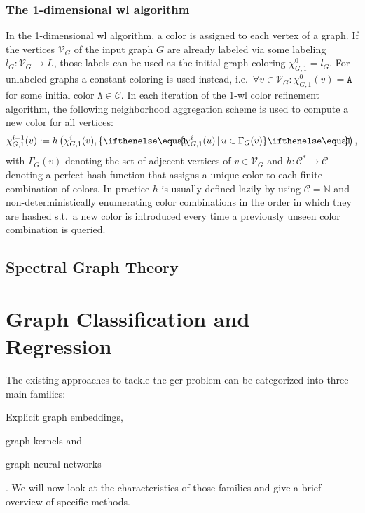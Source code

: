 \subsubsection{The 1-dimensional \acs{wl} algorithm}
In the 1-dimensional \ac{wl} algorithm, a color is assigned to each vertex of a graph.
If the vertices $\mathcal{V}_G$ of the input graph $G$ are already labeled via some labeling $l_G: \mathcal{V}_G \to L$, those labels can be used as the initial graph coloring $\chi_{G,1}^0 = l_G$.
For unlabeled graphs a constant coloring is used instead, i.e.\ $\forall v \in \mathcal{V}_G: \chi_{G,1}^0(v) = \texttt{A}$ for some initial color $\texttt{A} \in \mathcal{C}$.
In each iteration of the 1-\acs{wl} color refinement algorithm, the following neighborhood aggregation scheme is used to compute a new color for all vertices:
\begin{align}
	\chi_{G,1}^{i+1}(v) := h\left(\chi_{G,1}^{i}(v), \ldblbrace \chi_{G,1}^{i}(u)\, |\, u \in \Gamma_{G}(v) \rdblbrace\right) \text{,}
\end{align}
with $\Gamma_G(v)$ denoting the set of adjecent vertices of $v \in \mathcal{V}_G$ and $h: \mathcal{C}^* \to \mathcal{C}$ denoting a perfect hash function that assigns a unique color to each finite combination of colors.
In practice $h$ is usually defined lazily by using $\mathcal{C} = \mathbb{N}$ and non-deterministically enumerating color combinations in the order in which they are hashed s.t.\ a new color is introduced every time a previously unseen color combination is queried.



\subsection{Spectral Graph Theory}%
\label{sec:related:character:spectral}

\section{Graph Classification and Regression}%
\label{sec:related:gcr}

The existing approaches to tackle the \ac{gcr} problem can be categorized into three main families:
\begin{enumerate*}
	\item Explicit graph embeddings,
	\item graph kernels and
	\item graph neural networks
\end{enumerate*}.
We will now look at the characteristics of those families and give a brief overview of specific methods.

